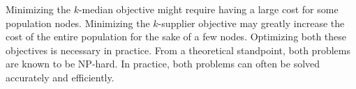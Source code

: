 Minimizing the $k$-median objective might require having a large cost for
some population nodes. Minimizing the $k$-supplier objective may greatly increase the cost of the entire population for the sake of a few nodes. Optimizing both these objectives is necessary in practice. From a theoretical standpoint, both problems are known to be NP-hard. In practice, both problems can often be solved accurately and efficiently.


